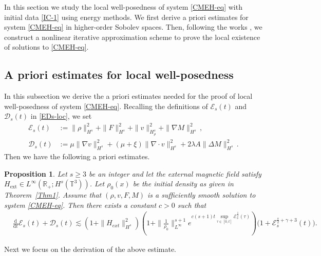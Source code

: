 \documentclass[reqno,11pt]{amsart}
\newtheorem{proposition}{Proposition}[section]
\numberwithin{equation}{section}
\def\d{\mathrm{d}}
\begin{document}
In this section we study the local well-posedness of system \eqref{CMEH-eq} with initial data \eqref{IC-1} using energy methods.  We first derive a priori estimates for system \eqref{CMEH-eq} in higher-order Sobolev spaces.  Then, following the works \cite{JLL-JDE-2023,JL-SIMA-2019,JLT-M3AS-2020}, we construct a nonlinear iterative approximation scheme to prove the local existence of solutions to \eqref{CMEH-eq}.


\subsection{A priori estimates for local well-posedness}

In this subsection we derive the a priori estimates needed for the proof of local well-posedness of system \eqref{CMEH-eq}.  Recalling the definitions of $\mathcal{E}_s(t)$ and $\mathcal{D}_s(t)$ in \eqref{EDs-loc}, we set
\begin{equation*}
	\begin{aligned}
		\mathcal{E}_s (t) & := \| \rho \|^2_{H^s} +  \| F \|^2_{H^s} + \| v \|^2_{H^s_\rho} +\|\nabla M\|^2_{H^s}\,, \\
		\mathcal{D}_s (t) & := \mu \| \nabla v \|^2_{H^s} + (\mu+\xi)\|\nabla\cdot v\| ^{2}_{H^{s}}+2\lambda A\|\Delta M\|^2_{H^s}  \,.
	\end{aligned}
\end{equation*}
Then we have the following a priori estimates.

\begin{proposition}\label{Prop-Loc}
    Let $s \ge 3$ be an integer and let the external magnetic field satisfy $H_{\text{ext}} \in L^\infty(\mathbb{R}_+; H^s(\mathbb{T}^3))$.  Let $\rho_0(x)$ be the initial density as given in Theorem~\ref{Thm1}.  Assume that $(\rho, v, F, M)$ is a sufficiently smooth solution to system \eqref{CMEH-eq}.  Then there exists a constant $c>0$ such that
\begin{equation}\label{Ener-Bnds-Local}
\begin{aligned}
& \frac{\d}{\d t} \mathcal{E}_s(t) + \mathcal{D}_s(t) \lesssim (1+\|H_{ext}\|^2_{H^s})(1 + \|\tfrac{1}{\rho_0}\|^{s+1}_{L^\infty} e^{c (s+1) t\sup_{\tau \in [0,t]} \mathcal{E}_s^{\frac{1}{2}}(\tau)}) \big( 1 + \mathcal{E}_s^{\frac{s}{2} + \gamma + 3} (t) \big) .
\end{aligned}
\end{equation}
\end{proposition}

Next we focus on the derivation of the above estimate.
\end{document}
